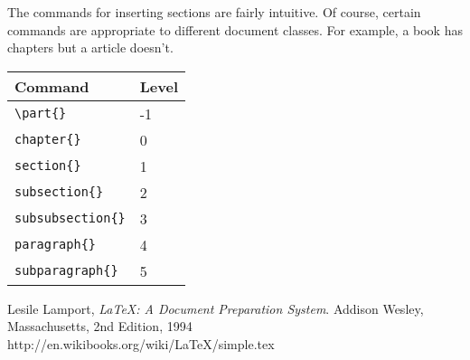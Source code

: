 \documentclass{article}
\begin{document}
\begin{itemize}
The commands for inserting sections are fairly intuitive. Of course,
certain commands are appropriate to different document classes.
For example, a book has chapters but a article doesn't.
\begin{center}
  \begin{tabular}{|l|l|}
    \hline
    Command & Level \\ \hline
    \verb|\part{}| & -1 \\
    \verb|chapter{}| & 0 \\
    \verb|section{}| & 1 \\
    \verb|subsection{}| & 2 \\
    \verb|subsubsection{}| & 3 \\
    \verb|paragraph{}| & 4 \\
    \verb|subparagraph{}| & 5 \\
    \hline
  \end{tabular}
\end{center}
\begin{thebibliography}{99}
  Lesile Lamport,
  \emph{\LaTeX: A Document Preparation System}.
  Addison Wesley, Massachusetts,
  2nd Edition,
  1994
  http://en.wikibooks.org/wiki/LaTeX/simple.tex
\end{thebibliography}

\end{itemize}
\end{document}
